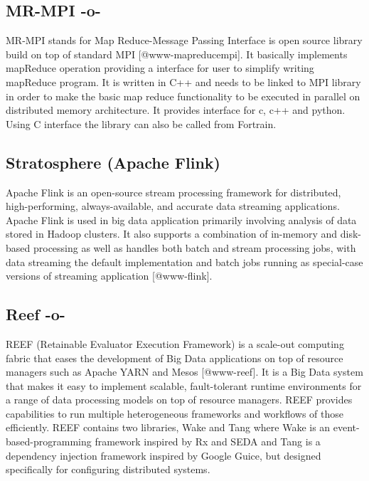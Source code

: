\subsection{MR-MPI -o-}

MR-MPI stands for Map Reduce-Message Passing Interface is open source
library build on top of standard MPI [@www-mapreducempi]. It
basically implements mapReduce operation providing a interface for
user to simplify writing mapReduce program.  It is written in C++ and
needs to be linked to MPI library in order to make the basic map
reduce functionality to be executed in parallel on distributed memory
architecture.  It provides interface for c, c++ and python. Using C
interface the library can also be called from Fortrain.



\subsection{Stratosphere (Apache Flink)}
     
Apache Flink is an open-source stream processing framework for
distributed, high-performing, always-available, and accurate data
streaming applications. Apache Flink is used in big data application
primarily involving analysis of data stored in Hadoop clusters.  It
also supports a combination of in-memory and disk-based processing as
well as handles both batch and stream processing jobs, with data
streaming the default implementation and batch jobs running as
special-case versions of streaming application [@www-flink].


\subsection{Reef -o-}

REEF (Retainable Evaluator Execution Framework) is a scale-out
computing fabric that eases the development of Big Data applications
on top of resource managers such as Apache YARN and
Mesos [@www-reef]. It is a Big Data system that makes it easy to
implement scalable, fault-tolerant runtime environments for a range of
data processing models on top of resource managers. REEF provides
capabilities to run multiple heterogeneous frameworks and workflows of
those efficiently. REEF contains two libraries, Wake and Tang where
Wake is an event-based-programming framework inspired by Rx and SEDA
and Tang is a dependency injection framework inspired by Google Guice,
but designed specifically for configuring distributed systems.



